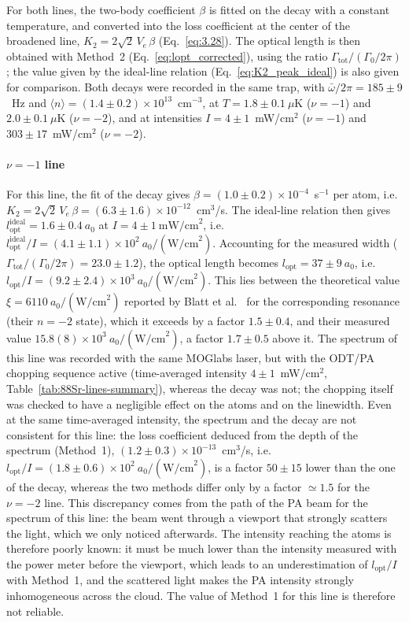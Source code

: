 For both lines, the two-body coefficient $\beta$ is fitted on the decay with a constant
temperature, and converted into the loss coefficient at the center of the broadened line,
$K_2=2\sqrt{2}\,V_e\,\beta$ (Eq.~\ref{eq:3.28}). The optical length is then obtained with Method~2
(Eq.~\ref{eq:lopt_corrected}), using the ratio $\Gamma_{\text{tot}}/(\Gamma_0/2\pi)$; the value given by
the ideal-line relation (Eq.~\ref{eq:K2_peak_ideal}) is also given for comparison. Both decays were recorded in the same trap,
with $\bar\omega/2\pi=185\pm9$~Hz and $\langle n\rangle=(1.4\pm0.2)\times10^{13}$~cm$^{-3}$, at
$T=1.8\pm0.1~\mu$K ($\nu=-1$) and $2.0\pm0.1~\mu$K ($\nu=-2$), and at intensities $I=4\pm1$~mW/cm$^2$
($\nu=-1$) and $303\pm17$~mW/cm$^2$ ($\nu=-2$).

\paragraph{$\nu=-1$ line}
For this line, the fit of the decay gives
$\beta=(1.0\pm0.2)\times10^{-4}$~s$^{-1}$ per atom, i.e.
$K_2=2\sqrt{2}\,V_e\,\beta=(6.3\pm1.6)\times10^{-12}$~cm$^3$/s. The ideal-line relation then gives
$l_{\text{opt}}^{\text{ideal}} = 1.6\pm0.4~a_0$ at $I = 4\pm1~\text{mW/cm}^2$, i.e.
$l_{\text{opt}}^{\text{ideal}}/I = (4.1\pm1.1)\times10^2~a_0/(\text{W/cm}^2)$.
Accounting for the measured width ($\Gamma_{\text{tot}}/(\Gamma_0/2\pi) = 23.0\pm1.2$), the
optical length becomes $l_{\text{opt}} = 37\pm9~a_0$, i.e.
$l_{\text{opt}}/I = (9.2\pm2.4)\times10^3~a_0/(\text{W/cm}^2)$. This lies between the
theoretical value $\xi = 6110~a_0/(\text{W/cm}^2)$ reported by Blatt et
al.~\cite{blatt_systematic_2011} for the corresponding resonance (their $n=-2$ state),
which it exceeds by a factor $1.5\pm0.4$, and their measured value
$15.8(8)\times10^3~a_0/(\text{W/cm}^2)$, a factor $1.7\pm0.5$ above it.
The spectrum of this line was recorded with the same MOGlabs laser, but with the ODT/PA
chopping sequence active (time-averaged intensity $4\pm1$~mW/cm$^2$,
Table~\ref{tab:88Sr-lines-summary}), whereas the decay was not; the chopping itself was checked
to have a negligible effect on the atoms and on the linewidth. Even at the same time-averaged
intensity, the spectrum and the decay are not consistent for this line: the loss coefficient
deduced from the depth of the spectrum (Method~1), $(1.2\pm0.3)\times10^{-13}$~cm$^3$/s, i.e.
$l_{\text{opt}}/I=(1.8\pm0.6)\times10^2~a_0/(\text{W/cm}^2)$, is a factor $50\pm15$ lower than the one
of the decay, whereas the two methods differ only by a factor $\simeq1.5$ for the $\nu=-2$ line.
This discrepancy comes from the path of the PA beam for the spectrum of this line: the beam
went through a viewport that strongly scatters the light, which we only noticed afterwards. The
intensity reaching the atoms is therefore poorly known: it must be much lower than the intensity
measured with the power meter before the viewport, which leads to an underestimation of
$l_{\text{opt}}/I$ with Method~1, and the scattered light makes the PA intensity strongly
inhomogeneous across the cloud. The value of Method~1 for this line is therefore not reliable.


